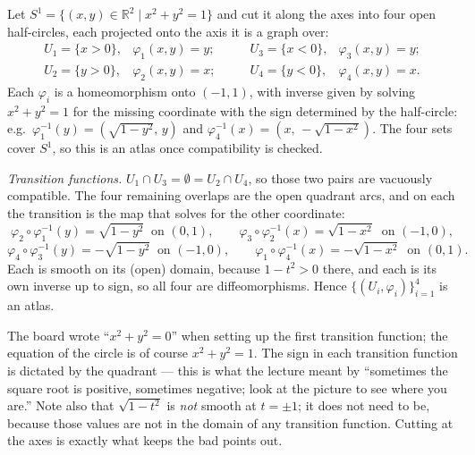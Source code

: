 \documentclass[11pt]{report}
\makeatletter
\newcounter{excounter}[section]
\newcommand{\exlabel}[1]{\edef\@currentlabel{\arabic{section}.\arabic{excounter}}\label{#1}}
\newcommand{\leeref}[1]{\par\smallskip{\raggedleft\footnotesize\textsc{Lee}:\ #1\par}}
\makeatother
\begin{document}
\begin{exbox}\exlabel{ex:circle-four}
Let $S^1 = \{(x,y) \in \mathbb{R}^2 \mid x^2 + y^2 = 1\}$ and cut it along the axes into four open half-circles, each projected onto the axis it is a graph over:
\[
\begin{array}{llll}
U_1 = \{x > 0\}, & \varphi_1(x,y) = y; \qquad & U_3 = \{x < 0\}, & \varphi_3(x,y) = y;\\
U_2 = \{y > 0\}, & \varphi_2(x,y) = x; & U_4 = \{y < 0\}, & \varphi_4(x,y) = x.
\end{array}
\]
Each $\varphi_i$ is a homeomorphism onto $(-1,1)$, with inverse given by solving $x^2 + y^2 = 1$ for the missing coordinate with the sign determined by the half-circle: e.g.\ $\varphi_1^{-1}(y) = (\sqrt{1-y^2},\, y)$ and $\varphi_4^{-1}(x) = (x,\, -\sqrt{1-x^2})$. The four sets cover $S^1$, so this is an atlas once compatibility is checked.

\emph{Transition functions.} $U_1 \cap U_3 = \emptyset = U_2 \cap U_4$, so those two pairs are vacuously compatible. The four remaining overlaps are the open quadrant arcs, and on each the transition is the map that solves for the other coordinate:
\[
\varphi_2 \circ \varphi_1^{-1}(y) = \sqrt{1-y^2} \ \text{ on } (0,1), \qquad
\varphi_3 \circ \varphi_2^{-1}(x) = \sqrt{1-x^2} \ \text{ on } (-1,0),
\]
\[
\varphi_4 \circ \varphi_3^{-1}(y) = -\sqrt{1-y^2} \ \text{ on } (-1,0), \qquad
\varphi_1 \circ \varphi_4^{-1}(x) = -\sqrt{1-x^2} \ \text{ on } (0,1).
\]
Each is smooth on its (open) domain, because $1 - t^2 > 0$ there, and each is its own inverse up to sign, so all four are diffeomorphisms. Hence $\{(U_i, \varphi_i)\}_{i=1}^4$ is an atlas.
\leeref{Examples 1.4 and 1.31}
\end{exbox}

The board wrote ``$x^2 + y^2 = 0$'' when setting up the first transition function; the equation of the circle is of course $x^2 + y^2 = 1$. The sign in each transition function is dictated by the quadrant --- this is what the lecture meant by ``sometimes the square root is positive, sometimes negative; look at the picture to see where you are.'' Note also that $\sqrt{1-t^2}$ is \emph{not} smooth at $t = \pm 1$; it does not need to be, because those values are not in the domain of any transition function. Cutting at the axes is exactly what keeps the bad points out.
\end{document}

